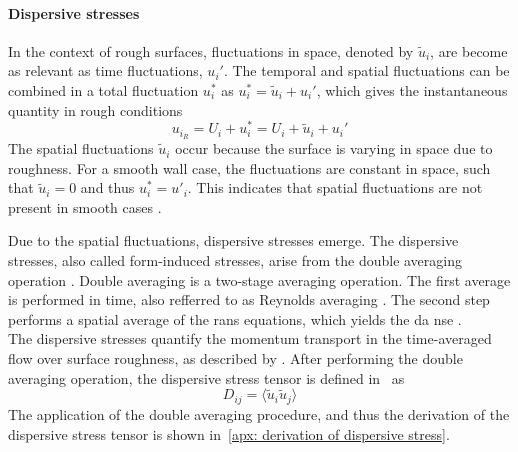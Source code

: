 \paragraph{Dispersive stresses}\label{par: dispersive stresses}
In the context of rough surfaces, fluctuations in space, denoted by $\tilde{u}_i$, are become as relevant as time fluctuations, $u_i'$.
The temporal and spatial fluctuations can be combined in a total fluctuation $u_i^*$ as $u_i^* = \tilde{u}_i + u_i'$, which gives the instantaneous quantity in rough conditions
\begin{equation}
    u_{i_R} = U_i + u_i^* = U_i + \tilde{u}_i + u_i' 
\end{equation}
The spatial fluctuations $\tilde{u}_i$ occur because the surface is varying in space due to roughness.
For a smooth wall case, the fluctuations are constant in space, such that $\tilde{u}_i = 0$ and thus $u^*_i = u'_i$.  This indicates  that spatial fluctuations are not present in smooth cases \citep{chanSecondaryMotionTurbulent2018}.

Due to the spatial fluctuations, dispersive stresses emerge.
The dispersive stresses, also called form-induced stresses, arise from the double averaging operation \citep{busseReynoldsnumberDependenceNearwall2017}.
Double averaging is a two-stage averaging operation. The first average is performed in time, also refferred to as Reynolds averaging \citep{raupachAveragingProceduresFlow1982}.
The second step performs a spatial average of the \acrshort{rans} equations, which yields the \acrfull{da} \acrlong{nse} \citep{busseReynoldsnumberDependenceNearwall2017}.\\
The dispersive stresses quantify the momentum transport in the time-averaged flow over surface roughness, as described by \cite{manesSignificanceForminducedStress2008}.
After performing the double averaging operation, the dispersive stress tensor is defined in~\cite{busseReynoldsnumberDependenceNearwall2017} as
\begin{equation}\label{eq: dispersive stress tensor}
    D_{ij} = \langle \tilde{u}_i \tilde{u}_j \rangle
\end{equation}
The application of the double averaging procedure, and thus the derivation of the dispersive stress tensor is shown in~\autoref{apx: derivation of dispersive stress}.




